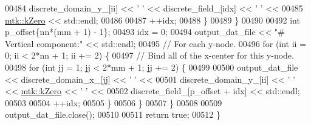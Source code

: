 \begin{DoxyCode}
00484           discrete\_domain\_y\_[ii] << \textcolor{charliteral}{' '} << discrete\_field\_[idx] << \textcolor{charliteral}{' '} <<
00485           \hyperlink{group__c01-roots_ga59a451a5fae30d59649bcda274fea271}{mtk::kZero} << std::endl;
00486 
00487         ++idx;
00488       \}
00489     \}
00490 
00492     \textcolor{keywordtype}{int} p\_offset\{nn*(mm + 1) - 1\};
00493     idx = 0;
00494     output\_dat\_file << \textcolor{stringliteral}{"# Vertical component:"} << std::endl;
00495     \textcolor{comment}{// For each y-node.}
00496     \textcolor{keywordflow}{for} (\textcolor{keywordtype}{int} ii = 0; ii < 2*nn + 1; ii += 2) \{
00497       \textcolor{comment}{// Bind all of the x-center for this y-node.}
00498       \textcolor{keywordflow}{for} (\textcolor{keywordtype}{int} jj = 1; jj < 2*mm + 1; jj += 2) \{
00499 
00500         output\_dat\_file << discrete\_domain\_x\_[jj] << \textcolor{charliteral}{' '} <<
00501           discrete\_domain\_y\_[ii] << \textcolor{charliteral}{' '} << \hyperlink{group__c01-roots_ga59a451a5fae30d59649bcda274fea271}{mtk::kZero} << \textcolor{charliteral}{' '} <<
00502           discrete\_field\_[p\_offset + idx] << std::endl;
00503 
00504         ++idx;
00505       \}
00506     \}
00507   \}
00508 
00509   output\_dat\_file.close();
00510 
00511   \textcolor{keywordflow}{return} \textcolor{keyword}{true};
00512 \}
\end{DoxyCode}
